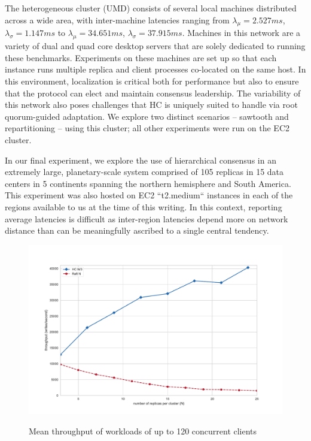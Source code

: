 The heterogeneous cluster (UMD) consists of several local machines distributed across a wide area, with inter-machine latencies ranging from
$\lambda_{\mu}=2.527ms$,
$\lambda_{\sigma}=1.147ms$ to $\lambda_{\mu}=34.651ms$,
$\lambda_{\sigma}=37.915ms$.
Machines in this network are a variety of dual and quad core desktop servers that are solely dedicated to running these benchmarks.
Experiments on these machines are set up so that each instance runs multiple replica and client processes co-located on the same host.
In this environment, localization is critical both for performance but also to ensure that the protocol can elect and maintain consensus leadership.
The variability of this network also poses challenges that HC is uniquely suited to handle via root quorum-guided adaptation.
We explore two distinct scenarios -- sawtooth and repartitioning -- using this cluster; all other experiments were run on the EC2 cluster.

In our final experiment, we explore the use of hierarchical consensus in an extremely large, planetary-scale system comprised of 105 replicas in 15 data centers in 5 continents spanning the northern hemisphere and South America. This experiment was also hosted on EC2 ``t2.medium`` instances in each of the regions available to us at the time of this writing. In this context, reporting average latencies is difficult as inter-region latencies depend more on network distance than can be meaningfully ascribed to a single central tendency.

\begin{figure}
    \begin{center}
        \includegraphics[width=5in]{figures/ch03_scaling_consensus.pdf}
    \end{center}
    \renewcommand{\baselinestretch}{1}
    \small\normalsize

    \begin{quote}
        \caption[Scaling Consensus HC vs. Raft]{Mean throughput of workloads of up to 120 concurrent clients}
        \label{fig:ch03_scaling_consensus}
    \end{quote}
\end{figure}
\renewcommand{\baselinestretch}{2}
\small\normalsize

